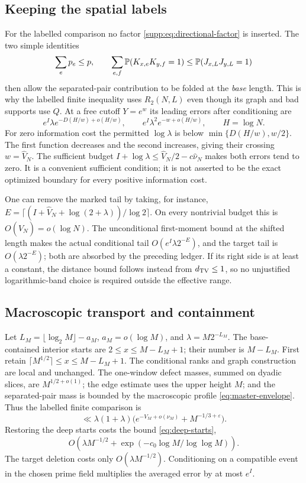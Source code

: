 \subsection{Keeping the spatial labels}
For the labelled comparison no factor \eqref{supp:eq:directional-factor}
is inserted. The two simple identities
\[
 \sum_ep_e\le p,\qquad
 \sum_{e,f}\mathbb P(K_{x,e}K_{y,f}=1)
                  \le\mathbb P(J_{x,L}J_{y,L}=1)
\]
then allow the separated-pair contribution to be folded at the
\emph{base} length. This is why the labelled finite inequality uses
$R_2(N,L)$ even though its graph and bad supports use $Q$.
At a free cutoff $Y=e^w$ its leading errors after conditioning are
\[
 e^I\lambda e^{-D(H/w)+o(H/w)},\qquad
 e^I\lambda^2 e^{-w+o(H/w)},\qquad H=\log N.
\]
For zero information cost the permitted $\log\lambda$ is below
$\min\{D(H/w),w/2\}$. The first function decreases and the second
increases, giving their crossing $w=\widehat V_N$.
The sufficient budget
$I+\log\lambda\le\widehat V_N/2-c\widehat\nu_N$
makes both errors tend to zero. It is a convenient sufficient
condition; it is not asserted to be the exact optimized boundary for
every positive information cost.

One can remove the marked tail by taking, for instance,
$E=\lceil(I+\widehat V_N+\log(2+\lambda))/\log2\rceil$.
On every nontrivial budget this is $O(\widehat V_N)=o(\log N)$.
The unconditional first-moment bound at the shifted length makes the
actual conditional tail $O(e^I\lambda2^{-E})$, and the target tail is
$O(\lambda2^{-E})$; both are absorbed by the preceding ledger.
If its right side is at least a constant, the distance bound follows
instead from $d_{\mathrm{TV}}\le1$, so no unjustified logarithmic-band choice is
required outside the effective range.

\subsection{Macroscopic transport and containment}\label{supp:sec:macro-marked}
Let $L_M=\lfloor\log_2M\rfloor-a_M$, $a_M=o(\log M)$, and
$\lambda=M2^{-L_M}$. The base-contained interior starts are
$2\le x\le M-L_M+1$; their number is $M-L_M$.
First retain $\lceil M^{1/2}\rceil\le x\le M-L_M+1$.
The conditional ranks and graph construction are local and unchanged.
The one-window defect masses, summed on dyadic slices, are
$M^{1/2+o(1)}$; the edge estimate uses the upper height $M$; and the
separated-pair mass is bounded by the macroscopic profile
\eqref{eq:master-envelope}. Thus the labelled finite comparison is
\[
 \ll\lambda(1+\lambda)
             \bigl(e^{-V_M+o(\nu_M)}+M^{-1/3+\varepsilon}\bigr).
\]
Restoring the deep starts costs the bound \eqref{eq:deep-starts},
\[
 O\left(\lambda M^{-1/2}
             +\exp(-c_0\log M/\log\log M)\right).
\]
The target deletion costs only $O(\lambda M^{-1/2})$.
Conditioning on a compatible event in the chosen prime field multiplies
the averaged error by at most $e^I$.

